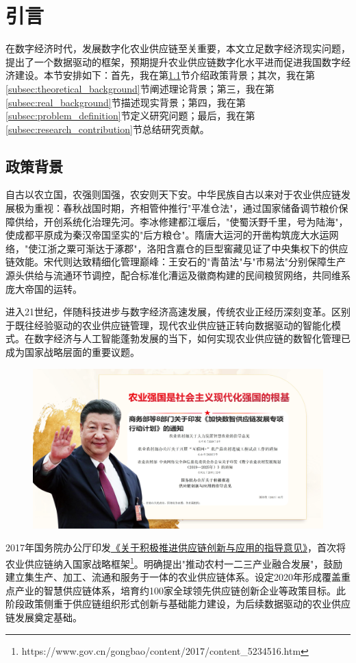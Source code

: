 \documentclass[lang=cn,12pt,a4paper]{elegantpaper}
\begin{document}
\section{引言}
\label{sec:introduction}
在数字经济时代，发展数字化农业供应链至关重要，本文立足数字经济现实问题，提出了一个数据驱动的框架，预期提升农业供应链数字化水平进而促进我国数字经济建设。本节安排如下：首先，我在第\ref{subsec:policy_background}节介绍政策背景；其次，我在第\ref{subsec:theoretical_background}节阐述理论背景；第三，我在第\ref{subsec:real_background}节描述现实背景；第四，我在第\ref{subsec:problem_definition}节定义研究问题；最后，我在第\ref{subsec:research_contribution}节总结研究贡献。

\subsection{政策背景}
\label{subsec:policy_background}
自古以农立国，农强则国强，农安则天下安。中华民族自古以来对于农业供应链发展极为重视：春秋战国时期，齐相管仲推行"平准仓法"，通过国家储备调节粮价保障供给，开创系统化治理先河。李冰修建都江堰后，"使蜀沃野千里，号为陆海"，使成都平原成为秦汉帝国坚实的"后方粮仓"。隋唐大运河的开凿构筑庞大水运网络，"使江浙之粟可渐达于涿郡"，洛阳含嘉仓的巨型窖藏见证了中央集权下的供应链效能。宋代则达致精细化管理巅峰：王安石的"青苗法"与"市易法"分别保障生产源头供给与流通环节调控，配合标准化漕运及徽商构建的民间粮贸网络，共同维系庞大帝国的运转。

进入21世纪，伴随科技进步与数字经济高速发展，传统农业正经历深刻变革。区别于既往经验驱动的农业供应链管理，现代农业供应链正转向数据驱动的智能化模式。在数字经济与人工智能蓬勃发展的当下，如何实现农业供应链的数智化管理已成为国家战略层面的重要议题。
\begin{figure}
    \centering
  \includegraphics[width=\linewidth]{policy.pdf}
\end{figure}
2017年国务院办公厅印发\href{https://www.gov.cn/gongbao/content/2017/content_5234516.htm}{《关于积极推进供应链创新与应用的指导意见》}，首次将农业供应链纳入国家战略框架\footnote{https://www.gov.cn/gongbao/content/2017/content\_5234516.htm}。明确提出"推动农村一二三产业融合发展"，鼓励建立集生产、加工、流通和服务于一体的农业供应链体系。设定2020年形成覆盖重点产业的智慧供应链体系，培育约100家全球领先供应链创新企业等政策目标。此阶段政策侧重于供应链组织形式创新与基础能力建设，为后续数据驱动的农业供应链发展奠定基础。
\end{document}
